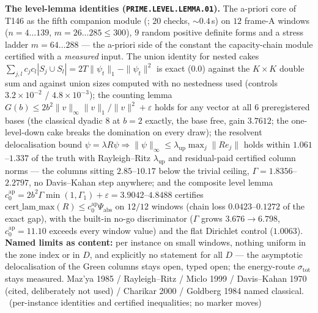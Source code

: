 \documentclass[11pt,a4paper]{article}
\theoremstyle{definition}
\begin{document}
\par\smallskip\noindent\textbf{The level-lemma identities
(\texttt{PRIME.LEVEL.LEMMA.01}).}
The a-priori core of T146 as the fifth companion module
(; $20$ checks, ${\sim}0.4$\,s) on $12$
frame-A windows ($n=4\ldots139$, $m=26\ldots285\le300$), $9$ random positive
definite forms and a stress ladder $m=64\ldots288$ --- the a-priori side of the
constant the capacity-chain module certified with a \emph{measured} input. The
union identity for nested cakes
$\sum_{j,l}c_jc_l|S_j\cup S_l|=2T\|\psi_t\|_1-\|\psi_t\|^2$ is exact ($0.0$)
against the $K\times K$ double sum and against union sizes computed with no
nestedness used (controls $3.2\times10^{-2}$ / $4.8\times10^{-3}$); the
counting lemma $G(b)\le2b^2\|v\|_\infty\|v\|_1/\|v\|^2+\varepsilon$ holds for
any vector at all $6$ preregistered bases (the classical dyadic $8$ at $b=2$
exactly, the base free, gain $3.7612$; the one-level-down cake breaks the
domination on every draw); the resolvent delocalisation bound
$\psi=\lambda R\psi\Rightarrow\|\psi\|_\infty\le\lambda_{\mathrm{up}}
\max_j\|Re_j\|$ holds within $1.061$--$1.337$ of the truth with Rayleigh--Ritz
$\lambda_{\mathrm{up}}$ and residual-paid certified column norms --- the
columns sitting $2.85$--$10.17$ below the trivial ceiling, $\Gamma=1.8356$--
$2.2797$, no Davis--Kahan step anywhere; and the composite level lemma
$c_0^{\mathrm{ap}}=2b^2\Gamma\min(1,\Gamma_1)+\varepsilon=3.9042$--$4.8488$
certifies $\mathrm{cert\_lam\_max}(R)\le c_0^{\mathrm{ap}}\Psi_{\mathrm{abs}}$
on $12/12$ windows (chain loss $0.0423$--$0.1272$ of the exact gap), with the
built-in no-go discriminator ($\Gamma$ grows $3.676\to6.798$,
$c_0^{\mathrm{ap}}=11.10$ exceeds every window value) and the flat Dirichlet
control ($1.0063$).
\textbf{Named limits as content:} per instance on small windows, nothing
uniform in the zone index or in $D$, and explicitly no statement for all $D$
--- the asymptotic delocalisation of the Green columns stays open, typed open;
the energy-route $\sigma_{\mathrm{tot}}$ stays measured. Maz'ya 1985 /
Rayleigh--Ritz / Miclo 1999 / Davis--Kahan 1970 (cited, deliberately not used)
/ Charikar 2000 / Goldberg 1984 named classical.
\mE\ (per-instance identities and certified inequalities; no marker moves)
\par\smallskip
\end{document}
